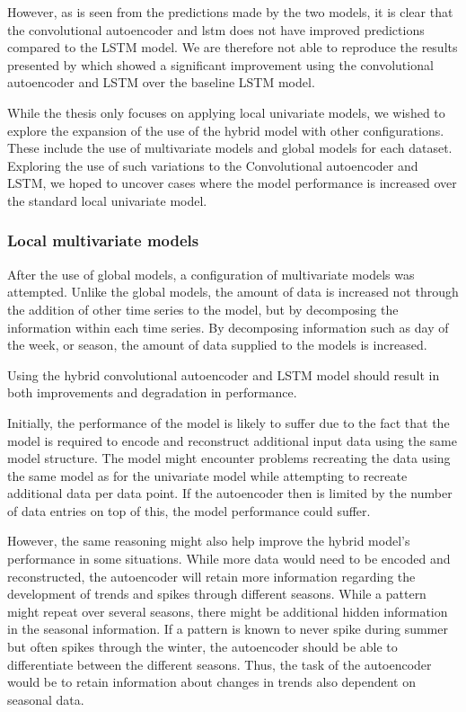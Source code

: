 However, as is seen from the predictions made by the two models, it is clear that the convolutional autoencoder and lstm
does not have improved predictions compared to the LSTM model.
We are therefore not able to reproduce the results presented by \cite{Zhao2019}
which showed a significant improvement using the convolutional autoencoder and LSTM over the baseline LSTM model.


While the thesis \cite{Zhao2019} only focuses on applying local univariate models,
we wished to explore the expansion of the use of the hybrid model with other configurations.
These include the use of multivariate models and global models for each dataset.
Exploring the use of such variations to the Convolutional autoencoder and LSTM,
we hoped to uncover cases where the model performance is increased over the standard local univariate model.

\subsubsection{Local multivariate models}

After the use of global models, a configuration of multivariate models was attempted.
Unlike the global models, the amount of data is increased not through the addition of other time series to the model,
but by decomposing the information within each time series.
By decomposing information such as day of the week, or season, the amount of data supplied to the models is increased.


Using the hybrid convolutional autoencoder and LSTM model should result in both improvements and degradation in performance.

Initially, the performance of the model is likely to suffer due to the fact that
the model is required to encode and reconstruct additional input data using the same model structure.
The model might encounter problems recreating the data using the same model as for the univariate model
while attempting to recreate additional data per data point.
If the autoencoder then is limited by the number of data entries on top of this, the model performance could suffer.

However, the same reasoning might also help improve the hybrid model's performance in some situations.
While more data would need to be encoded and reconstructed, the autoencoder will retain more information
regarding the development of trends and spikes through different seasons.
% 
While a pattern might repeat over several seasons, there might be additional hidden information in the seasonal information.
If a pattern is known to never spike during summer but often spikes through the winter,
the autoencoder should be able to differentiate between the different seasons.
Thus, the task of the autoencoder would be to retain information about changes in trends also dependent on seasonal data.


